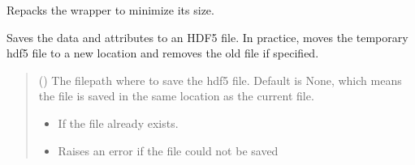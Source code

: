 \documentclass[letterpaper,10pt,english]{sphinxmanual}
\begin{document}
\begin{fulllineitems}
\begin{fulllineitems}
\label{\detokenize{source/HDF5_BLS:HDF5_BLS.wrapper.Wrapper.repack}}
\pysigstartsignatures
\pysiglinewithargsret
{}
{}
{}
\pysigstopsignatures
\sphinxAtStartPar
Repacks the wrapper to minimize its size.

\end{fulllineitems}


\begin{fulllineitems}
\label{\detokenize{source/HDF5_BLS:HDF5_BLS.wrapper.Wrapper.save_as_hdf5}}
\pysigstartsignatures
\pysiglinewithargsret
{}
{\sphinxparamcomma {}\sphinxparamcomma {}}
{}
\pysigstopsignatures
\sphinxAtStartPar
Saves the data and attributes to an HDF5 file. In practice, moves the temporary hdf5 file to a new location and removes the old file if specified.
\begin{quote}\begin{description}
\sphinxAtStartPar
{} (\sphinxstyleliteralemphasis{\sphinxupquote{, }}) \textendash{} The filepath where to save the hdf5 file. Default is None, which means the file is saved in the same location as the current file.

\begin{itemize}
\item {} 
\sphinxAtStartPar
{\hyperref[\detokenize{source/HDF5_BLS:HDF5_BLS.WrapperError.WrapperError_Overwrite}]{}} \textendash{} If the file already exists.

\item {} 
\sphinxAtStartPar
{\hyperref[\detokenize{source/HDF5_BLS:HDF5_BLS.WrapperError.WrapperError}]{}} \textendash{} Raises an error if the file could not be saved


\end{itemize}
\end{description}
\end{quote}
\end{fulllineitems}
\end{fulllineitems}
\end{document}

